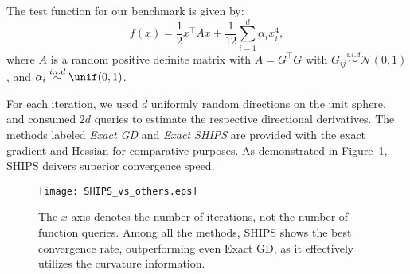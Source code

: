 The test function for our benchmark is given by:
\begin{equation}
    f(x) = \frac{1}{2}x^{\top}A x + \frac{1}{12} \sum_{i=1}^{d} \alpha_{i} x_{i}^{4},
\end{equation}
where $A$ is a random positive definite matrix with $A = G^{\top}G$ with $G_{ij} \stackrel{i.i.d}{\sim} \mathcal{N}(0, 1)$, and $\alpha_i \stackrel{i.i.d}{\sim} \unif(0, 1)$.

For each iteration, we used $d$ uniformly random directions on the unit sphere, and consumed $2d$ queries to estimate the respective directional derivatives. 
The methods labeled \emph{Exact GD} and \emph{Exact SHIPS} are provided with the exact gradient and Hessian for comparative purposes.
As demonstrated in Figure~\ref{fig:SHIPS_vs_others}, SHIPS deivers superior convergence speed.

\begin{figure}
    \centering
    \texttt{[image: SHIPS\_vs\_others.eps]}
    \caption{The $x$-axis denotes the number of iterations, not the number of function queries. Among all the methods, SHIPS shows the best convergence rate,  outperforming even Exact GD, as it effectively utilizes the curvature information.}
    \label{fig:SHIPS_vs_others}
\end{figure}